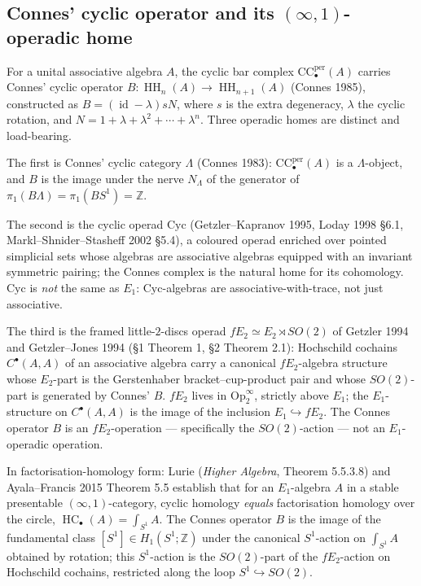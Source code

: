 \documentclass[11pt,reqno]{amsart}
\theoremstyle{plain}
\theoremstyle{definition}
\theoremstyle{remark}
\DeclareMathOperator{\id}{id}
\DeclareMathOperator{\HH}{HH}
\DeclareMathOperator{\HC}{HC}
\newcommand{\Zbb}{\mathbb{Z}}
\begin{document}
\subsection{Connes' cyclic operator and its $(\infty,1)$-operadic home}
\label{sub:B2-operad}
For a unital associative algebra $A$, the cyclic bar complex $\mathrm{CC}^{\mathrm{per}}_\bullet(A)$ carries Connes' cyclic operator $B : \HH_n(A) \to \HH_{n+1}(A)$ (Connes 1985), constructed as $B = (\id - \lambda)s N$, where $s$ is the extra degeneracy, $\lambda$ the cyclic rotation, and $N = 1 + \lambda + \lambda^2 + \cdots + \lambda^n$. Three operadic homes are distinct and load-bearing.

The first is Connes' cyclic category $\Lambda$ (Connes 1983): $\mathrm{CC}^{\mathrm{per}}_\bullet(A)$ is a $\Lambda$-object, and $B$ is the image under the nerve $N_\Lambda$ of the generator of $\pi_1(B\Lambda) = \pi_1(BS^1) = \Zbb$.

The second is the cyclic operad $\mathrm{Cyc}$ (Getzler--Kapranov 1995, Loday 1998 \S6.1, Markl--Shnider--Stasheff 2002 \S5.4), a coloured operad enriched over pointed simplicial sets whose algebras are associative algebras equipped with an invariant symmetric pairing; the Connes complex is the natural home for its cohomology. $\mathrm{Cyc}$ is \emph{not} the same as $E_1$: $\mathrm{Cyc}$-algebras are associative-with-trace, not just associative.

The third is the framed little-$2$-discs operad $fE_2 \simeq E_2 \rtimes SO(2)$ of Getzler 1994 and Getzler--Jones 1994 (\S1 Theorem 1, \S2 Theorem 2.1): Hochschild cochains $C^\bullet(A, A)$ of an associative algebra carry a canonical $fE_2$-algebra structure whose $E_2$-part is the Gerstenhaber bracket--cup-product pair and whose $SO(2)$-part is generated by Connes' $B$. $fE_2$ lives in $\mathrm{Op}^\infty_2$, strictly above $E_1$; the $E_1$-structure on $C^\bullet(A, A)$ is the image of the inclusion $E_1 \hookrightarrow fE_2$. The Connes operator $B$ is an $fE_2$-operation --- specifically the $SO(2)$-action --- not an $E_1$-operadic operation.

In factorisation-homology form: Lurie (\emph{Higher Algebra}, Theorem 5.5.3.8) and Ayala--Francis 2015 Theorem 5.5 establish that for an $E_1$-algebra $A$ in a stable presentable $(\infty,1)$-category, cyclic homology \emph{equals} factorisation homology over the circle, $\HC_\bullet(A) = \int_{S^1} A$. The Connes operator $B$ is the image of the fundamental class $[S^1] \in H_1(S^1; \Zbb)$ under the canonical $S^1$-action on $\int_{S^1} A$ obtained by rotation; this $S^1$-action is the $SO(2)$-part of the $fE_2$-action on Hochschild cochains, restricted along the loop $S^1 \hookrightarrow SO(2)$.
\end{document}
